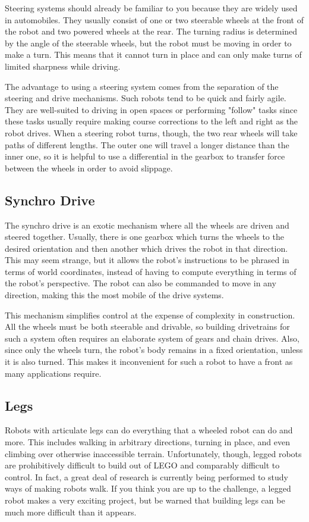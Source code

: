 Steering systems should already be familiar to you because they are widely used in automobiles.  They usually consist of one or two steerable wheels at the front of the robot and two powered wheels at the rear.  The turning radius is determined by the angle of the steerable wheels, but the robot must be moving in order to make a turn.  This means that it cannot turn in place and can only make turns of limited sharpness while driving.

The advantage to using a steering system comes from the separation of the steering and drive mechanisms.  Such robots tend to be quick and fairly agile.  They are well-suited to driving in open spaces or performing "follow" tasks since these tasks usually require making course corrections to the left and right as the robot drives.  When a steering robot turns, though, the two rear wheels will take paths of different lengths.  The outer one will travel a longer distance than the inner one, so it is helpful to use a differential in the gearbox to transfer force between the wheels in order to avoid slippage.

\subsection{Synchro Drive}

The synchro drive is an exotic mechanism where all the wheels are driven and steered together.  Usually, there is one gearbox which turns the wheels to the desired orientation and then another which drives the robot in that direction.  This may seem strange, but it allows the robot's instructions to be phrased in terms of world coordinates, instead of having to compute everything in terms of the robot's perspective.  The robot can also be commanded to move in any direction, making this the most mobile of the drive systems.

This mechanism simplifies control at the expense of complexity in construction.  All the wheels must be both steerable and drivable, so building drivetrains for such a system often requires an elaborate system of gears and chain drives. Also, since only the wheels turn, the robot's body remains in a fixed orientation, unless it is also turned.  This makes it inconvenient for such a robot to have a front as many applications require.

\subsection{Legs}

Robots with articulate legs can do everything that a wheeled robot can do and more.  This includes walking in arbitrary directions, turning in place, and even climbing over otherwise inaccessible terrain. Unfortunately, though, legged robots are prohibitively difficult to build out of LEGO and comparably difficult to control.  In fact, a great deal of research is currently being performed to study ways of making robots walk. If you think you are up to the challenge, a legged robot makes a very exciting project, but be warned that building legs can be much more difficult than it appears.
